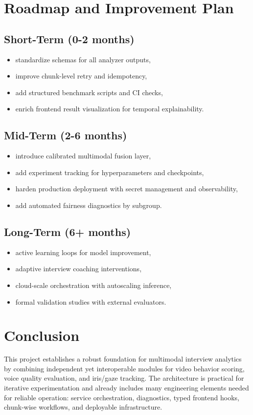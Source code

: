 \documentclass[12pt,a4paper]{report}
\begin{document}
\chapter{Roadmap and Improvement Plan}
\section{Short-Term (0-2 months)}
\begin{itemize}[leftmargin=1.5em]
\item standardize schemas for all analyzer outputs,
\item improve chunk-level retry and idempotency,
\item add structured benchmark scripts and CI checks,
\item enrich frontend result visualization for temporal explainability.
\end{itemize}

\section{Mid-Term (2-6 months)}
\begin{itemize}[leftmargin=1.5em]
\item introduce calibrated multimodal fusion layer,
\item add experiment tracking for hyperparameters and checkpoints,
\item harden production deployment with secret management and observability,
\item add automated fairness diagnostics by subgroup.
\end{itemize}

\section{Long-Term (6+ months)}
\begin{itemize}[leftmargin=1.5em]
\item active learning loops for model improvement,
\item adaptive interview coaching interventions,
\item cloud-scale orchestration with autoscaling inference,
\item formal validation studies with external evaluators.
\end{itemize}

\chapter{Conclusion}
This project establishes a robust foundation for multimodal interview analytics by combining independent yet interoperable modules for video behavior scoring, voice quality evaluation, and iris/gaze tracking. The architecture is practical for iterative experimentation and already includes many engineering elements needed for reliable operation: service orchestration, diagnostics, typed frontend hooks, chunk-wise workflows, and deployable infrastructure.
\end{document}

